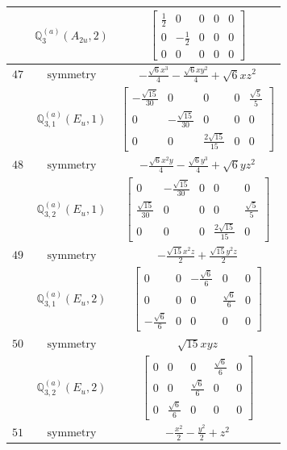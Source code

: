 \documentclass[fleqn,8pt,landscape]{jsarticle}
\begin{document}
\begin{longtable}{ccc}
$  $ & $ \mathbb{Q}_{3}^{(a)}(A_{2u},2) $ & $ \begin{bmatrix} \frac{1}{2} & 0 & 0 & 0 & 0 \\ 0 & - \frac{1}{2} & 0 & 0 & 0 \\ 0 & 0 & 0 & 0 & 0 \end{bmatrix} $ \\ \hline
$ 47 $ & $ \text{symmetry} $ & $ - \frac{\sqrt{6} x^{3}}{4} - \frac{\sqrt{6} x y^{2}}{4} + \sqrt{6} x z^{2} $ \\
$  $ & $ \mathbb{Q}_{3,1}^{(a)}(E_{u},1) $ & $ \begin{bmatrix} - \frac{\sqrt{15}}{30} & 0 & 0 & 0 & \frac{\sqrt{5}}{5} \\ 0 & - \frac{\sqrt{15}}{30} & 0 & 0 & 0 \\ 0 & 0 & \frac{2 \sqrt{15}}{15} & 0 & 0 \end{bmatrix} $ \\ \hline
$ 48 $ & $ \text{symmetry} $ & $ - \frac{\sqrt{6} x^{2} y}{4} - \frac{\sqrt{6} y^{3}}{4} + \sqrt{6} y z^{2} $ \\
$  $ & $ \mathbb{Q}_{3,2}^{(a)}(E_{u},1) $ & $ \begin{bmatrix} 0 & - \frac{\sqrt{15}}{30} & 0 & 0 & 0 \\ \frac{\sqrt{15}}{30} & 0 & 0 & 0 & \frac{\sqrt{5}}{5} \\ 0 & 0 & 0 & \frac{2 \sqrt{15}}{15} & 0 \end{bmatrix} $ \\ \hline
$ 49 $ & $ \text{symmetry} $ & $ - \frac{\sqrt{15} x^{2} z}{2} + \frac{\sqrt{15} y^{2} z}{2} $ \\
$  $ & $ \mathbb{Q}_{3,1}^{(a)}(E_{u},2) $ & $ \begin{bmatrix} 0 & 0 & - \frac{\sqrt{6}}{6} & 0 & 0 \\ 0 & 0 & 0 & \frac{\sqrt{6}}{6} & 0 \\ - \frac{\sqrt{6}}{6} & 0 & 0 & 0 & 0 \end{bmatrix} $ \\ \hline
$ 50 $ & $ \text{symmetry} $ & $ \sqrt{15} x y z $ \\
$  $ & $ \mathbb{Q}_{3,2}^{(a)}(E_{u},2) $ & $ \begin{bmatrix} 0 & 0 & 0 & \frac{\sqrt{6}}{6} & 0 \\ 0 & 0 & \frac{\sqrt{6}}{6} & 0 & 0 \\ 0 & \frac{\sqrt{6}}{6} & 0 & 0 & 0 \end{bmatrix} $ \\ \hline
$ 51 $ & $ \text{symmetry} $ & $ - \frac{x^{2}}{2} - \frac{y^{2}}{2} + z^{2} $ \\

\end{longtable}
\end{document}

